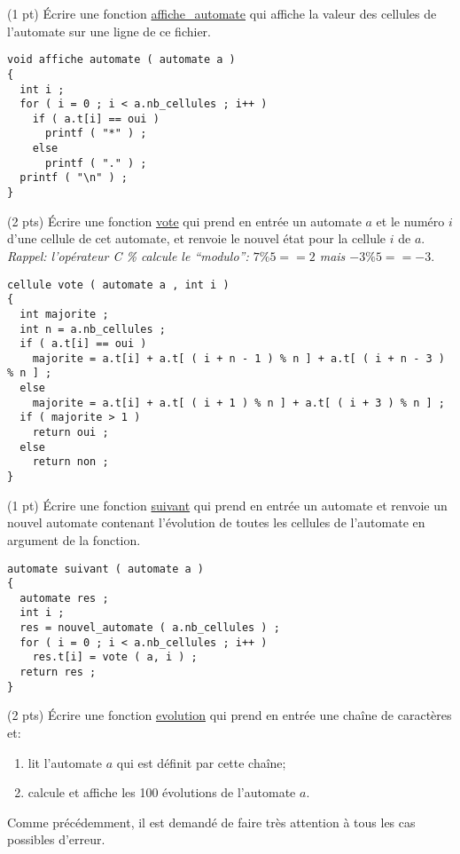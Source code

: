 \question (1 pt) {\'E}crire une fonction \url{affiche_automate} qui
affiche la valeur des cellules de l'automate sur une ligne de ce fichier.

\begin{solution}
  \begin{lstlisting}
void affiche automate ( automate a )
{
  int i ;
  for ( i = 0 ; i < a.nb_cellules ; i++ )
    if ( a.t[i] == oui )
      printf ( "*" ) ;
    else
      printf ( "." ) ;
  printf ( "\n" ) ;
}
  \end{lstlisting}
\end{solution}

\question (2 pts) {\'E}crire une fonction \url{vote} qui prend en entr{\'e}e
un automate $a$ et le num{\'e}ro $i$ d'une cellule de cet automate, et
renvoie le nouvel {\'e}tat pour la cellule $i$ de $a$. \textit{Rappel: 
l'op{\'e}rateur C \% calcule le ``modulo'': $7\% 5 == 2$  mais \(-3 \% 5 == -3\)}.

\begin{solution}
  \begin{lstlisting}
cellule vote ( automate a , int i )
{
  int majorite ;
  int n = a.nb_cellules ;
  if ( a.t[i] == oui )
    majorite = a.t[i] + a.t[ ( i + n - 1 ) % n ] + a.t[ ( i + n - 3 ) % n ] ;
  else
    majorite = a.t[i] + a.t[ ( i + 1 ) % n ] + a.t[ ( i + 3 ) % n ] ;
  if ( majorite > 1 )
    return oui ;
  else
    return non ;
}
  \end{lstlisting}
\end{solution}

\question (1 pt) {\'E}crire une fonction \url{suivant} qui prend en
entr{\'e}e un automate et renvoie un nouvel automate contenant
l'évolution de toutes les cellules de l'automate en argument de la fonction.

\begin{solution}
  \begin{lstlisting}
automate suivant ( automate a )
{
  automate res ;
  int i ;
  res = nouvel_automate ( a.nb_cellules ) ;
  for ( i = 0 ; i < a.nb_cellules ; i++ )
    res.t[i] = vote ( a, i ) ;
  return res ;
}
  \end{lstlisting}
\end{solution}

\question (2 pts) {\'E}crire une fonction \url{evolution} qui prend en
entr{\'e}e une chaîne de caractères et:
\begin{enumerate}
\item lit l'automate $a$ qui est d{\'e}finit par cette chaîne;
\item calcule et affiche les 100 {\'e}volutions de l'automate $a$.
\end{enumerate}
Comme pr{\'e}c{\'e}demment, il est demand{\'e} de faire tr{\`e}s
attention {\`a} tous les cas possibles d'erreur.

